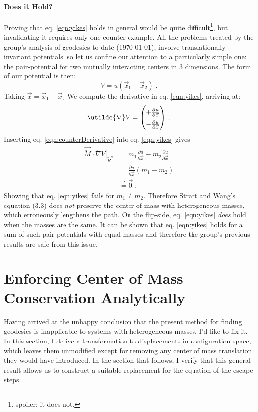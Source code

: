 \documentclass[letterpaper,12pt]{article}
\newcommand{\scmat}[1]{\vec{\utilde{#1}}}
\newcommand{\cvec}[1]{\utilde{#1}}
\newcommand{\svec}[1]{\vec{#1}}
\newcommand{\refeq}[1]{eq. \ref{eqn:#1}}
\newcommand{\laeq}[1]{\label{eqn:#1}}
\begin{document}
\paragraph{Does it Hold?}
Proving that \refeq{yikes} holds in general would  be quite difficult\footnote{spoiler: it does not.}, but invalidating it requires only one counter-example. All the problems treated by the group's analysis of geodesics to date (\today), involve translationally invariant potentials, so let us confine our attention to a particularly simple one: the pair-potential for two mutually interacting centers in 3 dimensions. The form of our potential is then:
\begin{equation}
V = u(\svec{x}_1 - \svec{x}_2) \; .
\end{equation}
Taking $\svec{x} = \svec{x}_1 - \svec{x}_2$ We compute the derivative in \refeq{yikes}, arriving at:
\begin{equation} \laeq{counterDerivative}
\renewcommand*{\arraystretch}{1.5}
\cvec{\nabla}V =
\begin{pmatrix}
+ \frac{\partial u}{\partial \svec{x}} \\
- \frac{\partial u}{\partial \svec{x}}
\end{pmatrix} \; .
\end{equation}
Inserting \refeq{counterDerivative} into \refeq{yikes} gives
\begin{equation}
\begin{aligned}
\scmat{M} \cdot \left. \cvec{\nabla}V\right|_{\cvec{R}^{n}} &= m_1 \frac{\partial u}{\partial \svec{x}} - m_2 \frac{\partial u}{\partial \svec{x}} \\
&= \frac{\partial u}{\partial \svec{x}} \left( m_1 - m_2 \right) \\
&\stackrel{?}{=} \svec{0} \; ,
\end{aligned}
\end{equation}
Showing that \refeq{yikes} fails for $m_1 \neq m_2$. Therefore Stratt and Wang's equation (3.3) does \emph{not} preserve the center of mass with heterogeneous masses, which erroneously lengthens the path. On the flip-side, \refeq{yikes} \emph{does} hold when the masses are the same. It can be shown that \refeq{yikes} holds for a sum of such pair potentials with equal masses and therefore the group's previous results are safe from this issue.

\section{Enforcing Center of Mass Conservation Analytically} \label{sec:enforceCM}
Having arrived at the unhappy conclusion that the present method for finding geodesics is inapplicable to systems with heterogeneous masses, I'd like to fix it. In this section, I derive a transformation to displacements in configuration space, which leaves them unmodified except for removing any center of mass translation they would have introduced. In the section that follows, I verify that this general result allows us to construct a suitable replacement for the equation of the escape steps.
\end{document}

